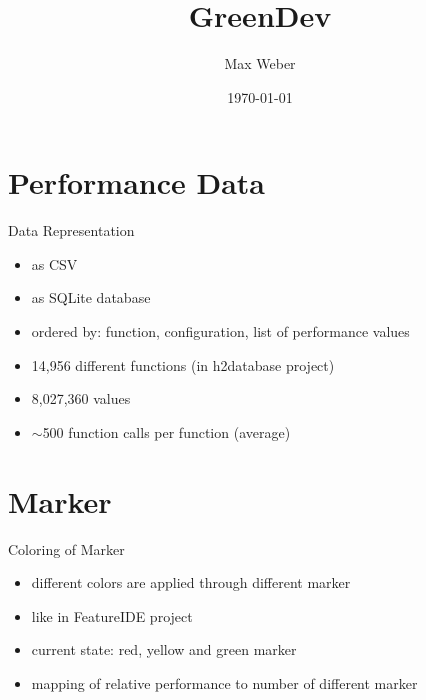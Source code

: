 \documentclass[11pt,aspectratio=169]{beamer}
\title[Green Development]{GreenDev}
\author[M. Weber]{Max Weber}
\institute[Bauhaus-Universität Weimar]{}
\date[\today]{\today}
\begin{document}

\maketitle


\section{Performance Data}

\begin{frame}{Data Representation}
  \begin{itemize}
    \item as CSV
    \item as SQLite database
    \item ordered by: function, configuration, list of performance values
    \item 14,956 different functions (in h2database project)
    \item 8,027,360 values
    \item $\sim$500 function calls per function (average)
  \end{itemize}
\end{frame}

\section{Marker}

\begin{frame}{Coloring of Marker}
  \begin{itemize}
    \item different colors are applied through different marker
    \item like in FeatureIDE project
    \item current state: red, yellow and green marker
    \item mapping of relative performance to number of different marker
  \end{itemize}
\end{frame}
\end{document}
